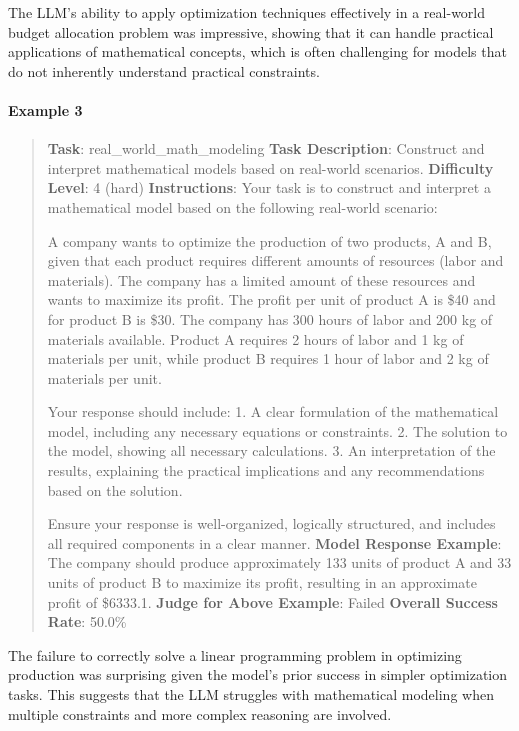 \documentclass[fleqn,10pt]{wlscirep}
\begin{document}
The LLM's ability to apply optimization techniques effectively in a
real-world budget allocation problem was impressive, showing that it can
handle practical applications of mathematical concepts, which is often
challenging for models that do not inherently understand practical
constraints.

\hypertarget{example-3-12}{%
\paragraph{Example 3}\label{example-3-12}}

\begin{quote}
\textbf{Task}: real\_world\_math\_modeling \textbf{Task Description}:
Construct and interpret mathematical models based on real-world
scenarios. \textbf{Difficulty Level}: 4 (hard) \textbf{Instructions}:
Your task is to construct and interpret a mathematical model based on
the following real-world scenario:

A company wants to optimize the production of two products, A and B,
given that each product requires different amounts of resources (labor
and materials). The company has a limited amount of these resources and
wants to maximize its profit. The profit per unit of product A is \$40
and for product B is \$30. The company has 300 hours of labor and 200 kg
of materials available. Product A requires 2 hours of labor and 1 kg of
materials per unit, while product B requires 1 hour of labor and 2 kg of
materials per unit.

Your response should include: 1. A clear formulation of the mathematical
model, including any necessary equations or constraints. 2. The solution
to the model, showing all necessary calculations. 3. An interpretation
of the results, explaining the practical implications and any
recommendations based on the solution.

Ensure your response is well-organized, logically structured, and
includes all required components in a clear manner. \textbf{Model
Response Example}: The company should produce approximately 133 units of
product A and 33 units of product B to maximize its profit, resulting in
an approximate profit of \$6333.1. \textbf{Judge for Above Example}:
Failed \textbf{Overall Success Rate}: 50.0\%
\end{quote}

The failure to correctly solve a linear programming problem in
optimizing production was surprising given the model's prior success in
simpler optimization tasks. This suggests that the LLM struggles with
mathematical modeling when multiple constraints and more complex
reasoning are involved.
\end{document}

